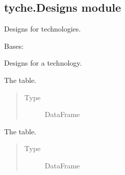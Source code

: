 \documentclass[letterpaper,10pt,english]{sphinxmanual}
\begin{document}
\subsection{tyche.Designs module}
\label{\detokenize{doc-src/tyche:module-tyche.Designs}}\label{\detokenize{doc-src/tyche:tyche-designs-module}}
Designs for technologies.

\begin{fulllineitems}
\label{\detokenize{doc-src/tyche:tyche.Designs.Designs}}
Bases: 

Designs for a technology.

\begin{fulllineitems}
\label{\detokenize{doc-src/tyche:tyche.Designs.Designs.indices}}
The  table.
\begin{quote}\begin{description}
\item[{Type}] \leavevmode
DataFrame

\end{description}\end{quote}

\end{fulllineitems}


\begin{fulllineitems}
\label{\detokenize{doc-src/tyche:tyche.Designs.Designs.functions}}
The  table.
\begin{quote}\begin{description}
\item[{Type}] \leavevmode
DataFrame

\end{description}\end{quote}


\end{fulllineitems}
\end{fulllineitems}
\end{document}
